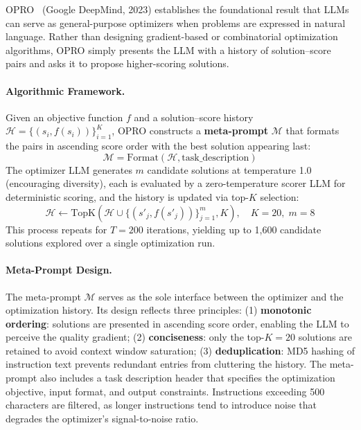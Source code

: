 OPRO~\citep{opro2023} (Google DeepMind, 2023) establishes the foundational result that LLMs can serve as general-purpose optimizers when problems are expressed in natural language. Rather than designing gradient-based or combinatorial optimization algorithms, OPRO simply presents the LLM with a history of solution--score pairs and asks it to propose higher-scoring solutions.

\paragraph{Algorithmic Framework.}
Given an objective function $f$ and a solution--score history $\mathcal{H}=\{(s_i, f(s_i))\}_{i=1}^{K}$, OPRO constructs a \textbf{meta-prompt} $\mathcal{M}$ that formats the pairs in ascending score order with the best solution appearing last:
\begin{equation}
\mathcal{M} = \text{Format}\left(\mathcal{H}, \text{task\_description}\right)
\end{equation}
The optimizer LLM generates $m$ candidate solutions at temperature 1.0 (encouraging diversity), each is evaluated by a zero-temperature scorer LLM for deterministic scoring, and the history is updated via top-$K$ selection:
\begin{equation}
\mathcal{H} \leftarrow \text{TopK}\left(\mathcal{H} \cup \{(s'_j, f(s'_j))\}_{j=1}^{m}, K\right), \quad K=20, \; m=8
\end{equation}
This process repeats for $T=200$ iterations, yielding up to 1,600 candidate solutions explored over a single optimization run.

\paragraph{Meta-Prompt Design.}
The meta-prompt $\mathcal{M}$ serves as the sole interface between the optimizer and the optimization history. Its design reflects three principles: (1) \textbf{monotonic ordering}: solutions are presented in ascending score order, enabling the LLM to perceive the quality gradient; (2) \textbf{conciseness}: only the top-$K=20$ solutions are retained to avoid context window saturation; (3) \textbf{deduplication}: MD5 hashing of instruction text prevents redundant entries from cluttering the history. The meta-prompt also includes a task description header that specifies the optimization objective, input format, and output constraints. Instructions exceeding 500 characters are filtered, as longer instructions tend to introduce noise that degrades the optimizer's signal-to-noise ratio.

